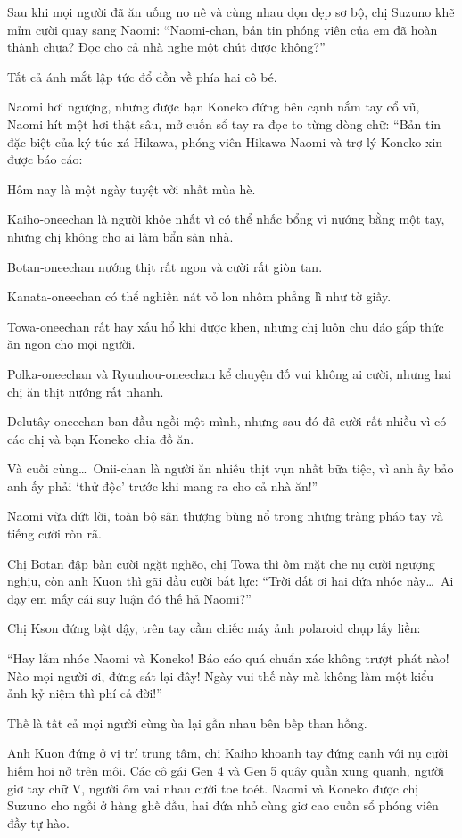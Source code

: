 \documentclass[../main.tex]{subfiles}
\begin{document}
Sau khi mọi người đã ăn uống no nê và cùng nhau dọn dẹp sơ bộ, chị Suzuno khẽ mỉm cười quay sang Naomi:
``Naomi-chan, bản tin phóng viên của em đã hoàn thành chưa? Đọc cho cả nhà nghe một chút được không?''

Tất cả ánh mắt lập tức đổ dồn về phía hai cô bé.

Naomi hơi ngượng, nhưng được bạn Koneko đứng bên cạnh nắm tay cổ vũ, Naomi hít một hơi thật sâu, mở cuốn sổ tay ra đọc to từng dòng chữ: ``Bản tin đặc biệt của ký túc xá Hikawa, phóng viên Hikawa Naomi và trợ lý Koneko xin được báo cáo:

Hôm nay là một ngày tuyệt vời nhất mùa hè.

Kaiho-oneechan là người khỏe nhất vì có thể nhấc bổng vỉ nướng bằng một tay, nhưng chị không cho ai làm bẩn sàn nhà.

Botan-oneechan nướng thịt rất ngon và cười rất giòn tan.

Kanata-oneechan có thể nghiền nát vỏ lon nhôm phẳng lì như tờ giấy.

Towa-oneechan rất hay xấu hổ khi được khen, nhưng chị luôn chu đáo gắp thức ăn ngon cho mọi người.

Polka-oneechan và Ryuuhou-oneechan kể chuyện đố vui không ai cười, nhưng hai chị ăn thịt nướng rất nhanh.

Delutây-oneechan ban đầu ngồi một mình, nhưng sau đó đã cười rất nhiều vì có các chị và bạn Koneko chia đồ ăn.

Và cuối cùng\dots\ Onii-chan là người ăn nhiều thịt vụn nhất bữa tiệc, vì anh ấy bảo anh ấy phải `thử độc' trước khi mang ra cho cả nhà ăn!''

Naomi vừa dứt lời, toàn bộ sân thượng bùng nổ trong những tràng pháo tay và tiếng cười ròn rã.

Chị Botan đập bàn cười ngặt nghẽo, chị Towa thì ôm mặt che nụ cười ngượng nghịu, còn anh Kuon thì gãi đầu cười bất lực: ``Trời đất ơi hai đứa nhóc này\dots\ Ai dạy em mấy cái suy luận đó thế hả Naomi?''

Chị Kson đứng bật dậy, trên tay cầm chiếc máy ảnh polaroid chụp lấy liền:

``Hay lắm nhóc Naomi và Koneko! Báo cáo quá chuẩn xác không trượt phát nào! Nào mọi người ơi, đứng sát lại đây! Ngày vui thế này mà không làm một kiểu ảnh kỷ niệm thì phí cả đời!''

Thế là tất cả mọi người cùng ùa lại gần nhau bên bếp than hồng.

Anh Kuon đứng ở vị trí trung tâm, chị Kaiho khoanh tay đứng cạnh với nụ cười hiếm hoi nở trên môi. Các cô gái Gen 4 và Gen 5 quây quần xung quanh, người giơ tay chữ V, người ôm vai nhau cười toe toét. Naomi và Koneko được chị Suzuno cho ngồi ở hàng ghế đầu, hai đứa nhỏ cùng giơ cao cuốn sổ phóng viên đầy tự hào.
\end{document}
